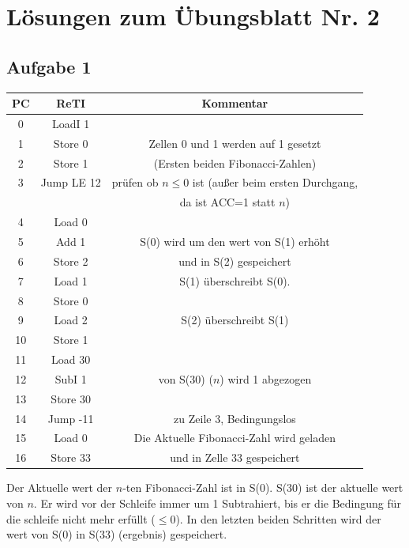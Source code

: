 \documentclass{scrartcl}
\begin{document}
	\section*{Lösungen zum Übungsblatt Nr. 2}

	\subsection*{Aufgabe 1}

		\begin{table}[h]

			\begin{tabular}{c|c|c}
				PC & ReTI & Kommentar \\
				\hline
				0 & LoadI 1 &  \\
        1 & Store 0 & Zellen 0 und 1 werden auf 1 gesetzt \\
				2 & Store 1 &  (Ersten beiden Fibonacci-Zahlen) \\ \hline
				3 & Jump LE 12 & prüfen ob \(n\le0\) ist (außer beim ersten Durchgang,\\&& da ist ACC=1 statt $n$) \\ \hline
				4 & Load 0 &  \\
        5 & Add 1 & S(0) wird um den wert von S(1) erhöht \\
				6 & Store 2 & und in S(2) gespeichert \\ \hline
        7 & Load 1 & S(1) überschreibt S(0). \\
				8 & Store 0 & \\%
        9 & Load 2 & S(2) überschreibt S(1) \\
				10 & Store 1 &  \\ \hline
				11 & Load 30 &  \\
        12 & SubI 1 & von S(30) ($n$) wird 1 abgezogen \\
				13 & Store 30 &  \\ \hline
				14 & Jump -11 & zu Zeile 3, Bedingungslos \\ \hline
				15 & Load 0 &  Die Aktuelle Fibonacci-Zahl wird geladen \\
				16 & Store 33 & und in Zelle 33 gespeichert \\
			\end{tabular}
		\end{table}

Der Aktuelle wert der $n$-ten Fibonacci-Zahl ist in S(0). S(30) ist der aktuelle wert von $n$.
Er wird vor der Schleife immer um 1 Subtrahiert,
bis er die Bedingung für die schleife nicht mehr erfüllt ($\le0$).
In den letzten beiden Schritten wird der wert von S(0) in S(33) (ergebnis) gespeichert.
\end{document}
